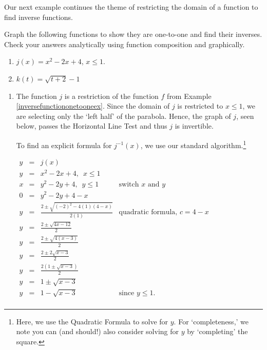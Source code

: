 \documentclass{ximera}
\begin{document}
Our next example continues the theme of restricting the domain of a function to find inverse functions.

\begin{example} \label{inverserestrictionex} Graph the following functions to show they are one-to-one and find their inverses. Check your answers analytically using function composition and graphically.

\begin{enumerate}

\item  $j(x) = x^2 - 2x + 4$, $x \leq 1$.

\item  $k(t) = \sqrt{t+2} - 1$

\end{enumerate}

\begin{explanation}

\begin{enumerate}

\item  The function $j$ is a restriction of the function $f$ from Example \ref{inversefunctiononetooneex}.  Since the domain of $j$ is restricted to $x \leq 1$, we are selecting only the `left half' of the parabola.  Hence, the graph of $j$, seen below,  passes the Horizontal Line Test and thus $j$ is invertible. 

To  find an explicit formula for $j^{-1}(x)$, we  use our standard algorithm.\footnote{Here, we use the Quadratic Formula to solve for $y$.  For `completeness,' we note you can (and should!) also consider solving for $y$ by `completing' the square.} 

\begin{center}
$ \begin{array}{rclr}
y & = & j(x) & \\
y & = & x^2-2x+4, \, \, \, x \leq 1 \\
x & = & y^2 - 2y+4, \, \, \, y \leq 1 & \text{switch $x$ and $y$} \\
0 & = & y^2 - 2y + 4-x & \\
y & = & \frac{2 \pm \sqrt{(-2)^2-4(1)(4-x)}}{2(1)} & \text{quadratic formula, $c=4-x$} \\  
y & = & \frac{2 \pm \sqrt{4x-12}}{2} & \\  
y & = & \frac{2 \pm \sqrt{4(x-3)}}{2} & \\  
y & = & \frac{2 \pm 2\sqrt{x-3}}{2} & \\  
y & = & \frac{2\left(1 \pm \sqrt{x-3}\right)}{2} & \\  
y & = & 1 \pm \sqrt{x-3} & \\
y & = & 1 - \sqrt{x-3} & \text{since $y \leq 1$.} \\
\end{array}$
\end{center}


\end{enumerate}
\end{explanation}
\end{example}
\end{document}
